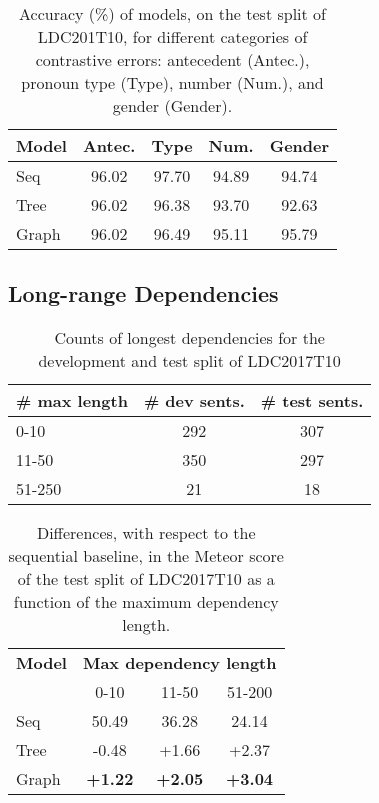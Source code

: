 \documentclass[11pt,a4paper]{article}
\begin{document}
\begin{table}
\centering
\begin{tabular}{lcccc}
\toprule
\textbf{Model} & \textbf{Antec.} & \textbf{Type} & \textbf{Num.} & \textbf{Gender}\\
\midrule
{\sc Seq} & 96.02 & 97.70 & 94.89 & 94.74\\
{\sc Tree} & 96.02 & 96.38 & 93.70 & 92.63\\ 
{\sc Graph} & 96.02 & 96.49 & 95.11 & 95.79\\
\bottomrule
\end{tabular}
\caption{Accuracy (\%) of models, on the test split of LDC201T10, for different categories of contrastive errors: antecedent (Antec.), pronoun type (Type), number (Num.), and gender (Gender).}
\label{tab:contrastive}
\end{table}

\subsection{Long-range Dependencies}
\label{sec:deps}
\begin{table}
\centering
\begin{tabular}{lcc}
\toprule
\textbf{\# max length} & \textbf{\# dev sents.} & \textbf{\# test sents.}\\
\midrule
0-10 & 292 & 307\\
11-50 & 350 & 297\\
51-250 & 21 & 18\\
\bottomrule
\end{tabular}
\caption{Counts of longest dependencies for the development and test split of LDC2017T10}
\label{tab:stats_dependencies}
\end{table}
\begin{table}
\centering
\begin{tabular}{lccc}
\toprule
\textbf{Model} & \multicolumn{3}{c}{\textbf{Max dependency length}}\\
& 0-10 & 11-50 & 51-200\\
\midrule
{\sc Seq} & 50.49 & 36.28 & 24.14 \\
{\sc Tree} & -0.48 & +1.66 & +2.37 \\ 
{\sc Graph} & \textbf{+1.22} & \textbf{+2.05} & \textbf{+3.04} \\
\bottomrule
\end{tabular}
\caption{Differences, with respect to the sequential baseline, in the Meteor score of the test split of LDC2017T10 as a function of the maximum dependency length.}
\label{tab:diff_deps}
\end{table}
\end{document}
